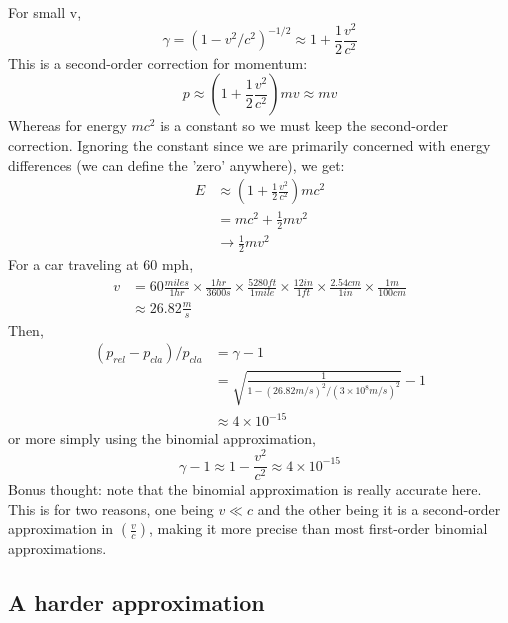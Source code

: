 \documentclass{article}
\begin{document}
For small v,
\begin{equation}
\gamma = (1-v^2/c^2)^{-1/2} \approx 1 + \frac{1}{2}\frac{v^2}{c^2}
\end{equation}
This is a second-order correction for momentum:
\begin{equation}
p \approx \left(1 + \frac{1}{2}\frac{v^2}{c^2}\right) mv \approx mv
\end{equation}
Whereas for energy $mc^2$ is a constant so we must keep the second-order correction. Ignoring the constant since we are primarily concerned with energy differences (we can define the 'zero' anywhere), we get:
\begin{align*}
E &\approx \left(1 + \frac{1}{2}\frac{v^2}{c^2}\right) mc^2 \\
&= mc^2 + \frac{1}{2} mv^2 \\
&\rightarrow \frac{1}{2} mv^2
\end{align*}
For a car traveling at 60 mph,
\begin{align*}
v &= 60 \frac{miles}{1 hr} \times \frac{1 hr}{3600 s} \times \frac{5280 ft}{1 mile} \times \frac{12 in}{1 ft} \times \frac{2.54 cm}{1 in} \times \frac{1 m}{100 cm} \\
&\approx 26.82 \frac{m}{s}
\end{align*}
Then,
\begin{align*}
(p_{rel}-p_{cla})/p_{cla} &= \gamma - 1 \\
&= \sqrt{\frac{1}{1-(26.82 m/s)^2/(3\times10^8 m/s)^2}} - 1 \\
&\approx 4 \times 10^{-15}
\end{align*}
or more simply using the binomial approximation,
\begin{equation}
\gamma - 1 \approx 1 - \frac{v^2}{c^2} \approx 4 \times 10^{-15}
\end{equation}
Bonus thought: note that the binomial approximation is really accurate here. This is for two reasons, one being $v\ll c$ and the other being it is a second-order approximation in $\left(\frac{v}{c}\right)$, making it more precise than most first-order binomial approximations.

\subsection{A harder approximation}
\end{document}
